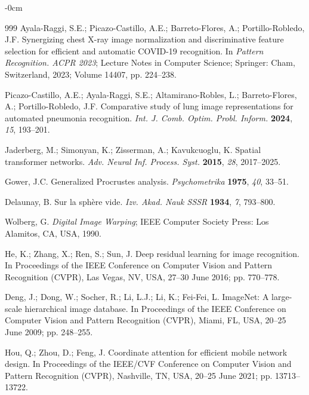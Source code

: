 \documentclass[applsci,article,submit,pdftex,moreauthors]{Definitions/mdpi}
\begin{document}
\begin{adjustwidth}{-\extralength}{0cm}
\begin{thebibliography}{999}
Ayala-Raggi, S.E.; Picazo-Castillo, A.E.; Barreto-Flores, A.; Portillo-Robledo, J.F. Synergizing chest X-ray image normalization and discriminative feature selection for efficient and automatic COVID-19 recognition. In \textit{Pattern Recognition. ACPR 2023}; Lecture Notes in Computer Science; Springer: Cham, Switzerland, 2023; Volume 14407, pp. 224--238.

Picazo-Castillo, A.E.; Ayala-Raggi, S.E.; Altamirano-Robles, L.; Barreto-Flores, A.; Portillo-Robledo, J.F. Comparative study of lung image representations for automated pneumonia recognition. \textit{Int. J. Comb. Optim. Probl. Inform.} \textbf{2024}, \textit{15}, 193--201.

Jaderberg, M.; Simonyan, K.; Zisserman, A.; Kavukcuoglu, K. Spatial transformer networks. \textit{Adv. Neural Inf. Process. Syst.} \textbf{2015}, \textit{28}, 2017--2025.

Gower, J.C. Generalized Procrustes analysis. \textit{Psychometrika} \textbf{1975}, \textit{40}, 33--51.

Delaunay, B. Sur la sph\`ere vide. \textit{Izv. Akad. Nauk SSSR} \textbf{1934}, \textit{7}, 793--800.

Wolberg, G. \textit{Digital Image Warping}; IEEE Computer Society Press: Los Alamitos, CA, USA, 1990.

He, K.; Zhang, X.; Ren, S.; Sun, J. Deep residual learning for image recognition. In Proceedings of the IEEE Conference on Computer Vision and Pattern Recognition (CVPR), Las Vegas, NV, USA, 27--30 June 2016; pp. 770--778.

Deng, J.; Dong, W.; Socher, R.; Li, L.J.; Li, K.; Fei-Fei, L. ImageNet: A large-scale hierarchical image database. In Proceedings of the IEEE Conference on Computer Vision and Pattern Recognition (CVPR), Miami, FL, USA, 20--25 June 2009; pp. 248--255.

Hou, Q.; Zhou, D.; Feng, J. Coordinate attention for efficient mobile network design. In Proceedings of the IEEE/CVF Conference on Computer Vision and Pattern Recognition (CVPR), Nashville, TN, USA, 20--25 June 2021; pp. 13713--13722.


\end{thebibliography}
\end{adjustwidth}
\end{document}
